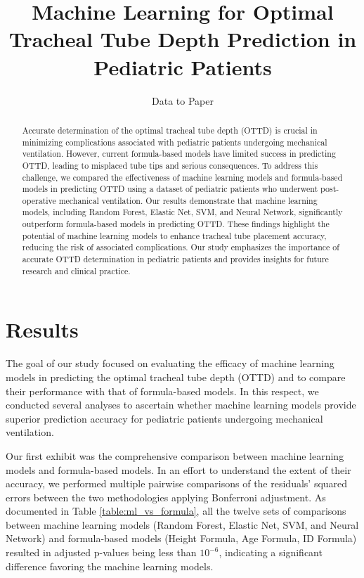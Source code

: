 \documentclass[11pt]{article}
\title{Machine Learning for Optimal Tracheal Tube Depth Prediction in Pediatric Patients}
\author{Data to Paper}
\begin{document}
\maketitle
\begin{abstract}
Accurate determination of the optimal tracheal tube depth (OTTD) is crucial in minimizing complications associated with pediatric patients undergoing mechanical ventilation. However, current formula-based models have limited success in predicting OTTD, leading to misplaced tube tips and serious consequences. To address this challenge, we compared the effectiveness of machine learning models and formula-based models in predicting OTTD using a dataset of pediatric patients who underwent post-operative mechanical ventilation. Our results demonstrate that machine learning models, including Random Forest, Elastic Net, SVM, and Neural Network, significantly outperform formula-based models in predicting OTTD. These findings highlight the potential of machine learning models to enhance tracheal tube placement accuracy, reducing the risk of associated complications. Our study emphasizes the importance of accurate OTTD determination in pediatric patients and provides insights for future research and clinical practice.
\end{abstract}
\section*{Results}

The goal of our study focused on evaluating the efficacy of machine learning models in predicting the optimal tracheal tube depth (OTTD) and to compare their performance with that of formula-based models. In this respect, we conducted several analyses to ascertain whether machine learning models provide superior prediction accuracy for pediatric patients undergoing mechanical ventilation.

Our first exhibit was the comprehensive comparison between machine learning models and formula-based models. In an effort to understand the extent of their accuracy, we performed multiple pairwise comparisons of the residuals' squared errors between the two methodologies applying Bonferroni adjustment. As documented in Table {}\ref{table:ml_vs_formula}, all the twelve sets of comparisons between machine learning models (Random Forest, Elastic Net, SVM, and Neural Network) and formula-based models (Height Formula, Age Formula, ID Formula) resulted in adjusted p-values being less than $10^{-6}$, indicating a significant difference favoring the machine learning models.
\end{document}
